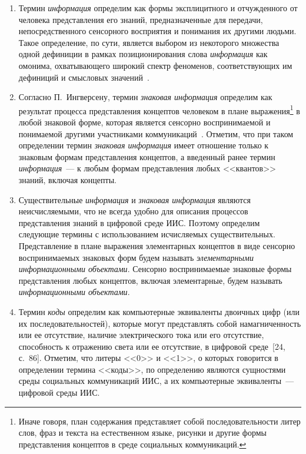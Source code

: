 \begin{multicols}{2}
\begin{enumerate}[1.]
{}
   \item Термин \textit{информация} определим как формы эксплицитного и отчужденного
от человека представления его знаний, предназначенные для %
пере\-да\-чи, непосредственного
сенсорного восприятия и понимания их другими людьми. Такое определение, по сути,
является выбором из некоторого множества одной дефиниции в рамках позиционирования
слова \textit{информация} как омонима, охватывающего широкий спектр феноменов,
соответствующих им дефиниций и смысловых значений~\cite{33za}.
   \item Согласно П.~Ингверсену, термин \textit{знаковая ин\-формация} определим как
результат процесса представления концептов человеком в плане выражения\footnote{Иначе
говоря, план содержания представляет собой последовательности литер слов, фраз и текста на
естественном языке, рисунки и другие формы представления концептов в среде социальных коммуникаций.} в
любой знаковой форме, которая\linebreak
 является сенсорно воспринимаемой и понимаемой другими
участниками коммуникаций~\cite{34za}. Отметим, что при таком определении термин
\textit{знаковая информация} имеет отношение только к знаковым формам представления
концептов, а введенный ранее термин \textit{информация}~--- к любым формам
представления любых <<квантов>> знаний, включая концепты.
   \item Существительные \textit{информация} и \textit{знаковая ин\-формация} являются
неисчисляемыми, что не %
 всегда удобно для описания процессов пред\-став\-ле\-ния знаний в
цифровой среде ИИС. Поэтому определим следующие термины с использованием
исчисляемых существительных. Представление в плане выражения эле\-мен\-тар\-ных концептов
в виде сенсорно вос\-при\-ни\-ма\-емых знаковых форм будем называть \textit{эле\-ментар\-ны\-ми
информационными объектами}. Сен\-сорно воспринимаемые знаковые формы пред\-став\-ле\-ния
любых концептов, включая элементарные, будем называть \textit{информационными
объ\-ек\-тами}.
{

}
   \item Термин \textit{коды} определим как компьютерные эквиваленты двоичных цифр
(или их последовательностей), которые могут представлять собой намагниченность или ее
отсутствие, наличие электрического тока или его отсутствие, способность к отражению света
или ее отсутствие, в цифровой среде~[24, с.~86]. Отметим, что литеры <<0>> и
<<1>>, о которых говорится в определении термина <<коды>>, по определению являются
сущностями среды социальных коммуникаций ИИС, а их компьютерные эквиваленты~---
циф\-ро\-вой среды ИИС.


\end{enumerate}
\end{multicols}
